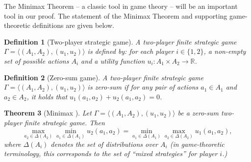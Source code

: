 \documentclass[11pt,letterpaper]{article}
\theoremstyle{plain}
\newtheorem{theorem}{Theorem}[section]
\newtheorem{definition}[theorem]{Definition}
\theoremstyle{definition}
\newcommand{\RR}{\mathbb{R}}
\newcommand{\rarr}{\rightarrow}
\begin{document}
The Minimax Theorem -- a classic tool in game theory -- will be an important tool in our proof. 
The statement of the Minimax Theorem and supporting game-theoretic definitions are given below.


\begin{definition}[Two-player strategic game]
A \emph{two-player finite strategic game} $\Gamma=\langle (A_1,A_2),(u_1,u_2)\rangle$ is defined by:
for each player $i\in\{1,2\}$,
a non-empty set of possible \emph{actions} $A_i$ and
a \emph{utility function} $u_i:A_1\times A_2\rarr\RR$.
\end{definition}

\begin{definition}[Zero-sum game]
A two-player finite strategic game $\Gamma=\langle (A_1,A_2),(u_1,u_2)\rangle$ is \emph{zero-sum} if
for any pair of actions $a_1\in A_1$ and $a_2\in A_2$, it holds that 
$u_1(a_1,a_2)+u_2(a_1,a_2)=0$.
\end{definition}

\begin{theorem}[Minimax \cite{vN44,Nash}]\label{thm:originalMinMax}
Let $\Gamma=\langle (A_1,A_2),(u_1,u_2)\rangle$ be a zero-sum two-player finite strategic game.
Then 
$$\max_{a_2\in \Delta(A_2)} \min_{a_1\in \Delta(A_1)} u_2(a_1,a_2) = \min_{a_1\in \Delta(A_1)} \max_{a_2\in \Delta(A_2)} u_1(a_1,a_2),$$
where $\Delta(A_i)$ denotes the set of distributions over $A_i$ (in game-theoretic terminology, this corresponds to the set of ``mixed strategies'' for player $i$.)
\end{theorem}

\iffalse
\begin{theorem}[Minimax \cite{vN44}]
Let $\Gamma=\langle (A_1,A_2),(u_1,u_2)\rangle$ be a zero-sum two-player finite strategic game.
Then 
$$\max_{a_2\in A_2} \min_{a_1\in A_1} u_2(a_1,a_2) = - \min_{a_2\in A_2} \max_{a_1\in A_1} u_1(a_1,a_2).$$
Moreover, $a_2\in A_2$ solves the problem $\max_{a_2\in A_2} \min_{a_1\in A_1} u_2(a_1,a_2)$
if and only if it solves the problem $\min_{a_2\in A_2} \max_{a_1\in A_1} u_1(a_1,a_2)$.
\end{theorem}
\fi
\end{document}
